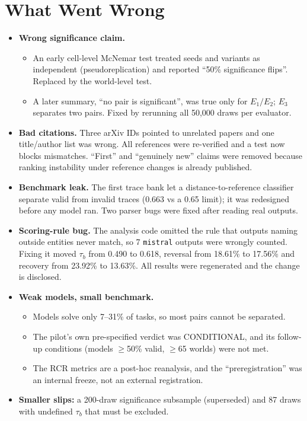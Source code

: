 \documentclass[11pt,a4paper]{article}
\newcommand{\E}[1]{E_{#1}}
\begin{document}
\section{What Went Wrong}
\begin{itemize}
\item \textbf{Wrong significance claim.}
  \begin{itemize}
  \item An early cell-level McNemar test treated seeds and variants as independent (pseudoreplication) and reported ``50\% significance flips''. Replaced by the world-level test.
  \item A later summary, ``no pair is significant'', was true only for $\E1/\E2$; $\E3$ separates two pairs. Fixed by rerunning all 50,000 draws per evaluator.
  \end{itemize}
\item \textbf{Bad citations.} Three arXiv IDs pointed to unrelated papers and one title/author list was wrong. All references were re-verified and a test now blocks mismatches. ``First'' and ``genuinely new'' claims were removed because ranking instability under reference changes is already published.
\item \textbf{Benchmark leak.} The first trace bank let a distance-to-reference classifier separate valid from invalid traces (0.663 vs a 0.65 limit); it was redesigned before any model ran. Two parser bugs were fixed after reading real outputs.
\item \textbf{Scoring-rule bug.} The analysis code omitted the rule that outputs naming outside entities never match, so 7 \texttt{mistral} outputs were wrongly counted. Fixing it moved $\tau_b$ from 0.490 to 0.618, reversal from 18.61\% to 17.56\% and recovery from 23.92\% to 13.63\%. All results were regenerated and the change is disclosed.
\item \textbf{Weak models, small benchmark.}
  \begin{itemize}
  \item Models solve only 7--31\% of tasks, so most pairs cannot be separated.
  \item The pilot's own pre-specified verdict was CONDITIONAL, and its follow-up conditions (models $\ge$50\% valid, $\ge$65 worlds) were not met.
  \item The RCR metrics are a post-hoc reanalysis, and the ``preregistration'' was an internal freeze, not an external registration.
  \end{itemize}
\item \textbf{Smaller slips:} a 200-draw significance subsample (superseded) and 87 draws with undefined $\tau_b$ that must be excluded.
\end{itemize}
\end{document}
